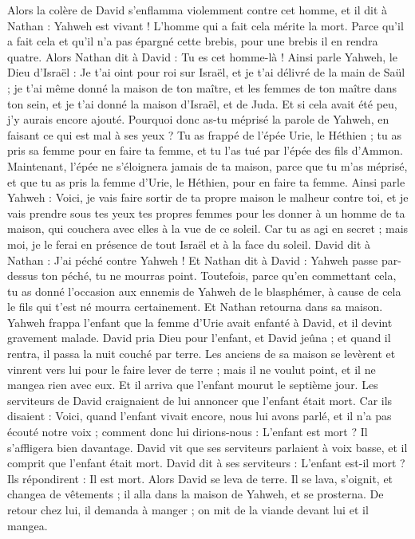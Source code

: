 \begin{multicols}{2}
Alors la colère de David s'enflamma violemment contre cet homme, et il dit à Nathan : Yahweh est vivant ! L'homme qui a fait cela mérite la mort.
Parce qu'il a fait cela et qu’il n’a pas épargné cette brebis, pour une brebis il en rendra quatre.
Alors Nathan dit à David : Tu es cet homme-là ! Ainsi parle Yahweh, le Dieu d'Israël : Je t'ai oint pour roi sur Israël, et je t'ai délivré de la main de Saül ;
je t'ai même donné la maison de ton maître, et les femmes de ton maître dans ton sein, et je t'ai donné la maison d'Israël, et de Juda. Et si cela avait été peu, j’y aurais encore ajouté.
Pourquoi donc as-tu méprisé la parole de Yahweh, en faisant ce qui est mal à ses yeux ? Tu as frappé de l'épée Urie, le Héthien ; tu as pris sa femme pour en faire ta femme, et tu l'as tué par l'épée des fils d’Ammon.
Maintenant, l'épée ne s’éloignera jamais de ta maison, parce que tu m'as méprisé, et que tu as pris la femme d'Urie, le Héthien, pour en faire ta femme.
Ainsi parle Yahweh : Voici, je vais faire sortir de ta propre maison le malheur contre toi, et je vais prendre sous tes yeux tes propres femmes pour les donner à un homme de ta maison, qui couchera avec elles à la vue de ce soleil.
Car tu as agi en secret ; mais moi, je le ferai en présence de tout Israël et à la face du soleil.
David dit à Nathan : J'ai péché contre Yahweh ! Et Nathan dit à David : Yahweh passe par-dessus ton péché, tu ne mourras point.
Toutefois, parce qu'en commettant cela, tu as donné l'occasion aux ennemis de Yahweh de le blasphémer, à cause de cela le fils qui t'est né mourra certainement.
Et Nathan retourna dans sa maison. Yahweh frappa l'enfant que la femme d'Urie avait enfanté à David, et il devint gravement malade.
David pria Dieu pour l'enfant, et David jeûna ; et quand il rentra, il passa la nuit couché par terre.
Les anciens de sa maison se levèrent et vinrent vers lui pour le faire lever de terre ; mais il ne voulut point, et il ne mangea rien avec eux.
Et il arriva que l'enfant mourut le septième jour. Les serviteurs de David craignaient de lui annoncer que l'enfant était mort. Car ils disaient : Voici, quand l'enfant vivait encore, nous lui avons parlé, et il n'a pas écouté notre voix ; comment donc lui dirions-nous : L'enfant est mort ? Il s'affligera bien davantage.
David vit que ses serviteurs parlaient à voix basse, et il comprit que l'enfant était mort. David dit à ses serviteurs : L'enfant est-il mort ? Ils répondirent : Il est mort.
Alors David se leva de terre. Il se lava, s'oignit, et changea de vêtements ; il alla dans la maison de Yahweh, et se prosterna. De retour chez lui, il demanda à manger ; on mit de la viande devant lui et il mangea.

\end{multicols}
